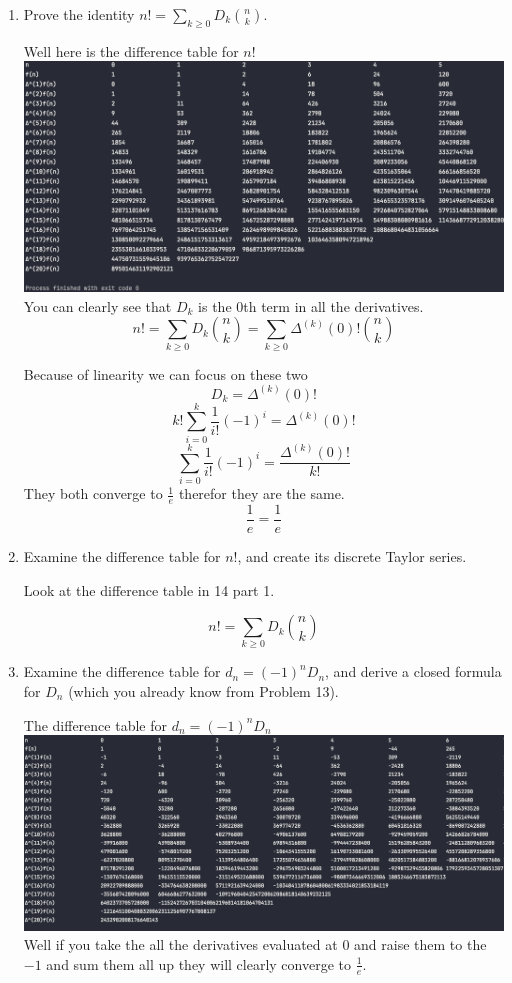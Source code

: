 \documentclass[10pt, AMS Euler]{article}
\begin{document}
	\begin{enumerate}
		\item  Prove the identity $n! = \sum_{k \geq 0} D_k \binom{n}{k}$.

        Well here is the difference table for $n!$ \\
        \includegraphics[scale=0.4]{Figures/n_fac_diff.png} \\
        You can clearly see that $D_k$ is the 0th term in all the derivatives. \\
        $$ n! = \sum_{k \geq 0} D_k \binom{n}{k} = \sum_{k \geq 0} \Delta^{(k)} (0)! \binom{n}{k} $$

        Because of linearity we can focus on these two
        $$ D_k = \Delta^{(k)} (0)! $$
        $$ k! \sum_{i = 0}^k \frac{1}{i!} (-1)^i = \Delta^{(k)} (0)! $$
        $$ \sum_{i = 0}^k \frac{1}{i!} (-1)^i = \frac{\Delta^{(k)} (0)!}{k!} $$
        They both converge to $\frac{1}{e}$ therefor they are the same.
        $$ \frac{1}{e} = \frac{1}{e} $$

  
		\item  Examine the difference table for $n!$, and create its discrete Taylor series.

        Look at the difference table in 14 part 1. 

        $$ n! = \sum_{k \geq 0} D_k \binom{n}{k} $$


  
		\item Examine the difference table for $d_n = (-1)^n D_n$, and derive a closed formula for $D_n$ (which you already know from Problem 13). 

        The difference table for $d_n = (-1)^n D_n$ \\
        \includegraphics[scale=0.4]{Figures/dn_diff_table.png} \\
        Well if you take the all the derivatives evaluated at 0 and raise them to the $-1$ and sum them all up they will clearly converge to $\frac{1}{e}$. 
        

\end{enumerate}
\end{document}
